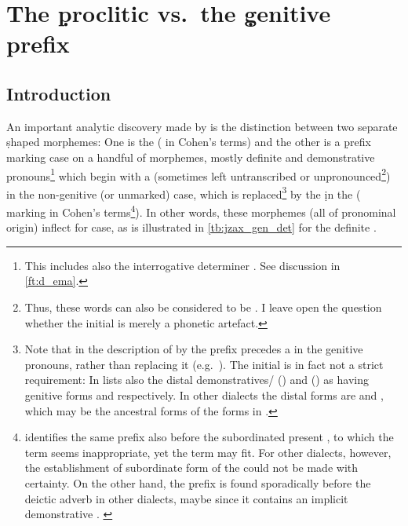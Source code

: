 \section{The \d proclitic vs.\ the \d genitive prefix} \label{ss:d_gen}
\largerpage
\subsection{Introduction}

An important analytic discovery made by \citet{CohenNucleus} is the distinction between two separate \d shaped morphemes: One is the  \lnk* ( in Cohen's terms) and the other is a \d prefix marking \gen* case on a handful of  morphemes, mostly definite  and demonstrative pronouns\footnote{This includes also the  interrogative determiner . See discussion in \vref{ft:d_ema}.} which begin with a  (sometimes left untranscribed or unpronounced\footnote{Thus, these words can also be considered to be . I leave open the question whether the initial  is merely a phonetic artefact.}) in the non-genitive (or  unmarked) case, which is replaced\footnote{Note that in the description of \Diy  by \citet[93]{NapiorkowskaDiyana} the \d prefix precedes a  in the genitive pronouns, rather than replacing it (e.g.\ ). The initial  is in fact not a strict requirement: In \JZax \citet[109]{CohenZakho} lists also the distal demonstratives/  (\masc) and  (\fem) as having  genitive forms  and  respectively. In other dialects the distal forms are  and , which may be the ancestral forms of the forms in \JZax.} by the \d in the  ( marking in Cohen's terms\footnote{\citet[90]{CohenNucleus} identifies the same prefix also before the subordinated present , to which the term  seems inappropriate, yet the term  may fit. For other dialects, however, the establishment of subordinate form of the  could not be made with certainty. On the other hand, the \d prefix is found sporadically before the deictic adverb  in other dialects, maybe since it contains an implicit demonstrative . \label{fn:d_gen_axxa}}).
 In other words, these morphemes (all of pronominal origin) inflect for case, as is illustrated in \vref{tb:jzax_gen_det} for the definite .


